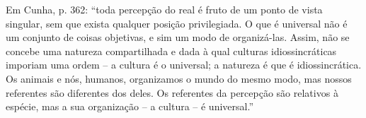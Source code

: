 Em Cunha, p. 362: \enquote{toda percepção do real é fruto de um ponto de vista singular, sem que exista qualquer posição privilegiada. O que é universal não é um conjunto de coisas objetivas, e sim um modo de organizá-las. Assim, não se concebe uma natureza compartilhada e dada à qual culturas idiossincráticas imporiam uma ordem -- a cultura é o universal; a natureza é que é idiossincrática. Os animais e nós, humanos, organizamos o mundo do mesmo modo, mas nossos referentes são diferentes dos deles. Os referentes da percepção são relativos à espécie, mas a sua organização -- a cultura -- é universal.}